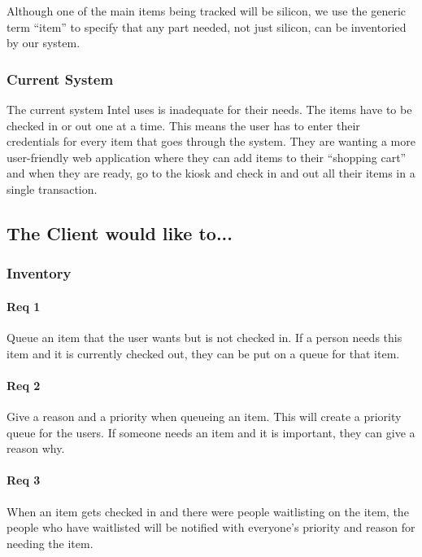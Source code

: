 \documentclass[10pt, onecolumn, twoside, peerreview]{IEEEtran}
\begin{document}
Although one of the main items being tracked will be silicon, we use the generic term “item” to specify that any part
needed, not just silicon, can be inventoried by our system.\\

\subsubsection{Current System}
The current system Intel uses is inadequate for their needs. The items have to be checked in or out one at a time. This
means the user has to enter their credentials for every item that goes through the system. They are wanting a more
user-friendly web application where they can add items to their “shopping cart” and when they are ready, go to the
kiosk and check in and out all their items in a single transaction.\\

\subsection{The Client would like to...}

\subsubsection{Inventory}
\paragraph*{Req 1} Queue an item that the user wants but is not checked in. If a person needs this item and it is currently checked out,
they can be put on a queue for that item.\\

\paragraph*{Req 2} Give a reason and a priority when queueing an item. This will create a priority queue for the users. If someone needs
an item and it is important, they can give a reason why.\\

\paragraph*{Req 3} When an item gets checked in and there were people waitlisting on the item, the people who have waitlisted will be
notified with everyone's priority and reason for needing the item.\\
\end{document}
